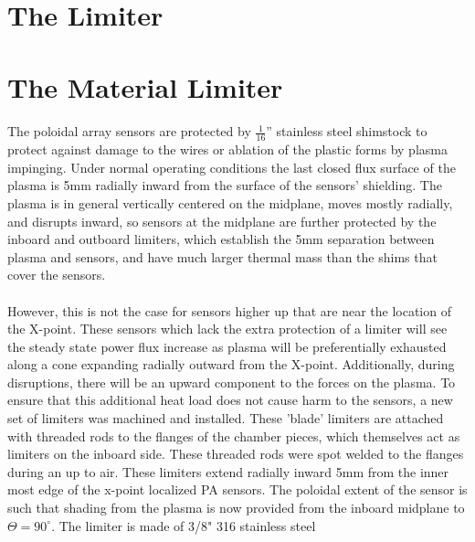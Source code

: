\section{The Limiter}


\section{The Material Limiter}
\paragraph{}The poloidal array sensors are protected by $\frac{1}{16}$'' stainless steel shimstock to protect against damage to the wires or ablation of the plastic forms by plasma impinging.  Under normal operating conditions the last closed flux surface of the plasma is 5mm radially inward from the surface of the sensors' shielding.  The plasma is in general vertically centered on the midplane, moves mostly radially, and disrupts inward, so sensors at the midplane are further protected by the inboard and outboard limiters, which establish the 5mm separation between plasma and sensors, and have much larger thermal mass than the shims that cover the sensors.
\paragraph{}However, this is not the case for sensors higher up that are near the location of the X-point.  These sensors which lack the extra protection of a limiter will see the steady state power flux increase as plasma will be preferentially exhausted along a cone expanding radially outward from the X-point.  Additionally, during disruptions, there will be an upward component to the forces on the plasma.  To ensure that this additional heat load does not cause harm to the sensors, a new set of limiters was machined and installed.  These 'blade' limiters are attached with threaded rods to the flanges of the chamber pieces, which themselves act as limiters on the inboard side.  These threaded rods were spot welded to the flanges during an up to air.  These limiters extend radially inward 5mm from the inner most edge of the x-point localized PA sensors.  The poloidal extent of the sensor is such that shading from the plasma is now provided from the inboard midplane to $\Theta = 90^{\circ}$.  The limiter is made of 3/8" 316 stainless steel
